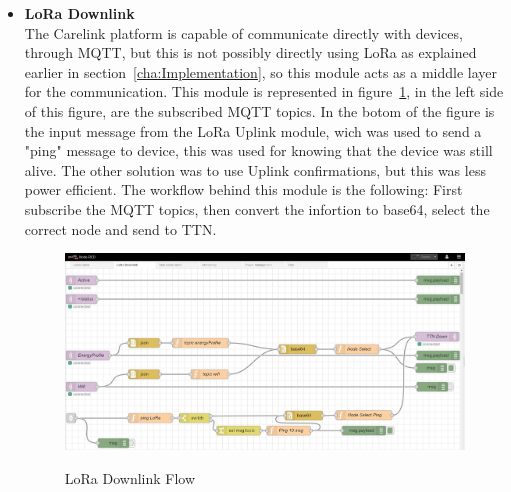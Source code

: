 \begin{itemize}
   \item \textbf{LoRa Downlink} \\
   The Carelink platform is capable of  communicate directly with devices, through MQTT, but this is not possibly directly using LoRa as explained earlier in section~\ref{cha:Implementation}, so this module acts as a middle layer for the communication. This module is represented in figure~\ref{fig:LoRa_Downlink}, in the left side of this figure, are the subscribed MQTT topics. In the botom of the figure is the input message from the LoRa Uplink module, wich was used to send a "ping" message to device, this was used for knowing that the device was still alive. The other solution was to use Uplink confirmations, but this was less power efficient. The workflow behind this module is the following: First subscribe the MQTT topics, then convert the infortion to base64,  select the correct node and send to TTN.
   
     \begin{figure}[htbp]
      \centering
      
        {\includegraphics[width=0.9\linewidth]{Chapters/Figures/LoRaDownlink.JPG}}
     
      \caption{LoRa Downlink Flow}
      \label{fig:LoRa_Downlink}
    \end{figure}
\end{itemize}


